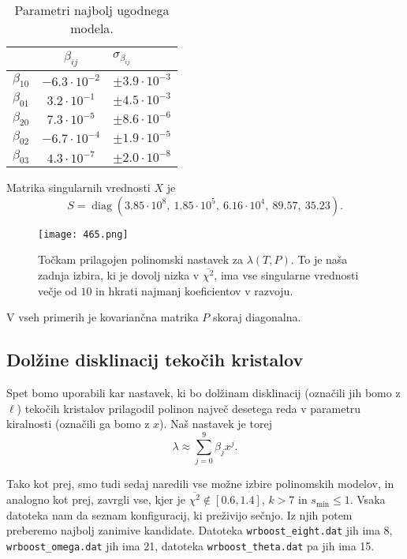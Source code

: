 \documentclass[a4 paper, 12pt]{article}
\newcommand{\diag}{
	\operatorname{diag}
}
\begin{document}
\begin{table}[H]\centering
	\caption{Parametri najbolj ugodnega modela.}
	\begin{tabular}{r|c|l}
		             & $\beta_{ij}$& $\sigma_{\beta_{ij}}$ \\
		\hline
		$\beta_{10}$ & $-6.3 \cdot 10^{-2}$ & $\pm 3.9 \cdot 10^{-3}$ \\
		$\beta_{01}$ & $3.2 \cdot 10^{-1}$  & $\pm 4.5 \cdot 10^{-3}$ \\
		$\beta_{20}$ & $7.3 \cdot 10^{-5}$  & $\pm 8.6 \cdot 10^{-6}$ \\
		$\beta_{02}$ & $-6.7 \cdot 10^{-4}$ & $\pm 1.9 \cdot 10^{-5}$ \\
		$\beta_{03}$ & $4.3 \cdot 10^{-7}$  & $\pm 2.0 \cdot 10^{-8}$
	\end{tabular}
	\label{tab3}
\end{table}
Matrika singularnih vrednosti $X$ je
\begin{equation}
	S = \diag(3.85 \cdot 10^8,\ 1.85 \cdot 10^5,\ 6.16 \cdot 10^4,\ 89.57,\ 35.23).
\end{equation}

\begin{figure}[H]\centering
	\texttt{[image: 465.png]}
	\caption{To\v ckam prilagojen polinomski nastavek za $\lambda (T, P)$. To je na\v sa zadnja izbira, ki je dovolj
		nizka v $\overline{\chi^2}$, ima vse singularne vrednosti ve\v cje od $10$ in hkrati najmanj koeficientov
		v razvoju.}
	\label{zmaga}
\end{figure}

V vseh primerih je kovarian\v cna matrika $P$ skoraj diagonalna.

\subsection{Dol\v zine disklinacij teko\v cih kristalov}

Spet bomo uporabili kar nastavek, ki bo dol\v zinam disklinacij (ozna\v cili jih bomo z $\ell$) teko\v cih kristalov
prilagodil polinon najve\v c desetega  reda v parametru kiralnosti (ozna\v cili ga bomo z $x$). Na\v s nastavek je torej
\begin{equation}
	\lambda \approx \sum_{j = 0}^9 \beta_j x^j.
\end{equation}

Tako kot prej, smo tudi sedaj naredili vse mo\v zne izbire polinomskih modelov, in analogno kot prej, zavrgli vse, kjer
je $\overline{\chi^2} \notin [0.6, 1.4]$, $k > 7$ in $s_\text{min} \leq 1$. Vsaka datoteka nam da seznam konfiguracij, ki
pre\v zivijo se\v cnjo. Iz njih potem preberemo najbolj zanimive kandidate. Datoteka {\tt wrboost\_eight.dat} jih ima 8,
{\tt wrboost\_omega.dat} jih ima 21, datoteka {\tt wrboost\_theta.dat} pa jih ima 15.
\end{document}
